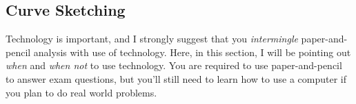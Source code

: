 \documentclass[12pt,addpoints, answers, fleqn]{exam}
\begin{document}
\subsection{Curve Sketching}


Technology is important, and I strongly suggest that you \emph{intermingle} paper-and-pencil analysis with use of technology. Here, in this section, I will be pointing out \emph{when} and \emph{when not} to use technology. You are required to use paper-and-pencil to answer exam questions, but you'll still need to learn how to use a computer if you plan to do real world problems.

\end{document}
